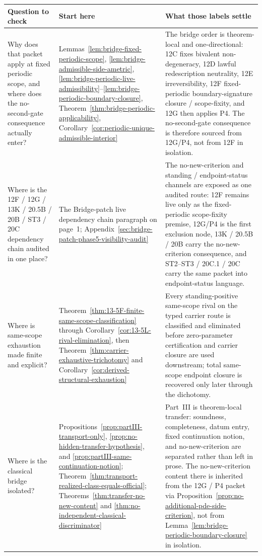 \begin{tcolorbox}[title={Theorem map for a first audit pass (continued)}, colback=blue!2!white, colframe=blue!55!black, boxsep=1pt, left=2pt, right=2pt, top=2pt, bottom=2pt]
\scriptsize
\renewcommand{\arraystretch}{1.08}
\setlength{\tabcolsep}{3pt}
\begin{tabularx}{\textwidth}{@{}L{0.28\textwidth}L{0.32\textwidth}Y@{}}
\toprule
\textbf{Question to check} & \textbf{Start here} & \textbf{What those labels settle}\\
\midrule
Why does that packet apply at fixed periodic scope, and where does the no-second-gate consequence actually enter? & Lemmas~\ref{lem:bridge-fixed-periodic-scope}, \ref{lem:bridge-admissible-side-ametric}, \ref{lem:bridge-periodic-live-admissibility}--\ref{lem:bridge-periodic-boundary-closure}, Theorem~\ref{thm:bridge-periodic-applicability}, Corollary~\ref{cor:periodic-unique-admissible-interior} & The bridge order is theorem-local and one-directional: 12C fixes bivalent non-degeneracy, 12D lawful redescription neutrality, 12E irreversibility, 12F fixed-periodic boundary-signature closure / scope-fixity, and 12G then applies P4. The no-second-gate consequence is therefore sourced from 12G/P4, not from 12F in isolation.\\
Where is the 12F / 12G / 13K / 20.5B / 20B / ST3 / 20C dependency chain audited in one place? & The Bridge-patch live dependency chain paragraph on page~1; Appendix~\ref{sec:bridge-patch-phase5-visibility-audit} & The no-new-criterion and standing / endpoint-status channels are exposed as one audited route: 12F remains live only as the fixed-periodic scope-fixity premise, 12G/P4 is the first exclusion node, 13K / 20.5B / 20B carry the no-new-criterion consequence, and ST2--ST3 / 20C.1 / 20C carry the same packet into endpoint-status language.\\
Where is same-scope exhaustion made finite and explicit? & Theorem~\ref{thm:13-5F-finite-same-scope-classification} through Corollary~\ref{cor:13-5L-rival-elimination}, then Theorem~\ref{thm:carrier-exhaustive-trichotomy} and Corollary~\ref{cor:derived-structural-exhaustion} & Every standing-positive same-scope rival on the typed carrier route is classified and eliminated before zero-parameter certification and carrier closure are used downstream; total same-scope endpoint closure is recovered only later through the dichotomy.\\
Where is the classical bridge isolated? & Propositions~\ref{prop:partIII-transport-only}, \ref{prop:no-hidden-transfer-hypothesis}, and \ref{prop:partIII-same-continuation-notion}; Theorem~\ref{thm:transport-realized-class-equals-official}; Theorems~\ref{thm:transfer-no-new-content} and \ref{thm:no-independent-classical-discriminator} & Part~III is theorem-local transfer: soundness, completeness, datum entry, fixed continuation notion, and no-new-criterion are separated rather than left in prose. The no-new-criterion content there is inherited from the 12G / P4 packet via Proposition~\ref{prop:no-additional-pde-side-criterion}, not from Lemma~\ref{lem:bridge-periodic-boundary-closure} in isolation.\\

\end{tabularx}
\end{tcolorbox}

